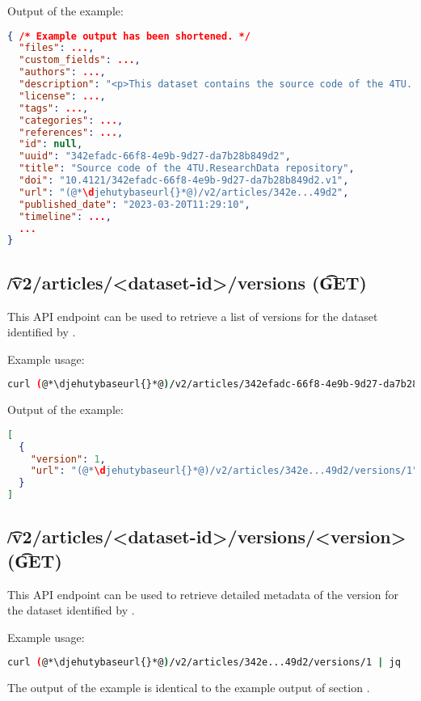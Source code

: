   Output of the example:
\begin{lstlisting}[language=JSON]
{ /* Example output has been shortened. */
  "files": ...,
  "custom_fields": ...,
  "authors": ...,
  "description": "<p>This dataset contains the source code of the 4TU...",
  "license": ...,
  "tags": ...,
  "categories": ...,
  "references": ...,
  "id": null,
  "uuid": "342efadc-66f8-4e9b-9d27-da7b28b849d2",
  "title": "Source code of the 4TU.ResearchData repository",
  "doi": "10.4121/342efadc-66f8-4e9b-9d27-da7b28b849d2.v1",
  "url": "(@*\djehutybaseurl{}*@)/v2/articles/342e...49d2",
  "published_date": "2023-03-20T11:29:10",
  "timeline": ...,
  ...
}
\end{lstlisting}

\subsection{\t{/v2/articles/<dataset-id>/versions} (\t{GET})}

  This API endpoint can be used to retrieve a list of versions for the dataset
  identified by .

  Example usage:
\begin{lstlisting}[language=bash]
curl (@*\djehutybaseurl{}*@)/v2/articles/342efadc-66f8-4e9b-9d27-da7b28b849d2/versions | jq
\end{lstlisting}

  Output of the example:
\begin{lstlisting}[language=JSON]
[
  {
    "version": 1,
    "url": "(@*\djehutybaseurl{}*@)/v2/articles/342e...49d2/versions/1"
  }
]
\end{lstlisting}

\subsection{\t{/v2/articles/<dataset-id>/versions/<version>} (\t{GET})}

  This API endpoint can be used to retrieve detailed metadata of the version
   for the dataset identified by .

  Example usage:
\begin{lstlisting}[language=bash]
curl (@*\djehutybaseurl{}*@)/v2/articles/342e...49d2/versions/1 | jq
\end{lstlisting}

  The output of the example is identical to the example output of section
  .

